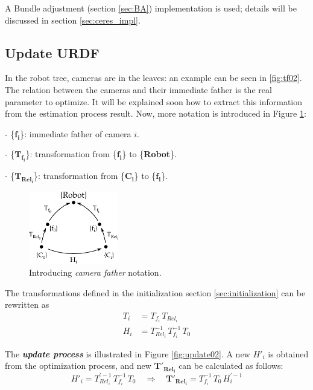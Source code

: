 A Bundle adjustment (section \ref{sec:BA}) implementation is used; details will be discussed in section \ref{sec:ceres_impl}.


\subsection{Update URDF}
\label{sec:update_urdf}

In the robot tree, cameras are in the leaves: an example can be seen in \ref{fig:tf02}. The relation between the cameras and their immediate father is the real parameter to optimize. It will be explained soon how to extract this information from the estimation process result. Now, more notation is introduced in Figure \ref{fig:update01}:
\begin{itemize*}
 \item[-]  \{$\mathbf{f_i}$\}: immediate father of camera $i$.

 \item[-]  \{$\mathbf{T_{f_i}}$\}: transformation from \{$\mathbf{f_i}$\} to \{\textbf{Robot}\}.

 \item[-]  \{$\mathbf{T_{Rel_i}}$\}: transformation from \{$\mathbf{C_i}$\} to \{$\mathbf{f_i}$\}.

\end{itemize*}

\begin{figure}[!htbp]
 \centering
 \includegraphics[width=0.35\textwidth]{images/update01.pdf}
 \caption{Introducing \textit{camera father} notation.}
 \label{fig:update01}
\end{figure}

The transformations defined in the initialization section \ref{sec:initialization} can be rewritten as
\begin{align}
 T_i &= T_{f_i} \, T_{Rel_i} \\
 H_i &= T_{Rel_i}^{-1} \, T_{f_i}^{-1} \, T_0
\end{align}


The \textit{\textbf{update process}} is illustrated in Figure \ref{fig:update02}.
A new $H'_i$ is obtained from the optimization process, and new $\mathbf{T'_{Rel_i}}$ can be calculated as follows:
\begin{equation}
 H'_i = T_{Rel_i}^{' -1} \, T_{f_i}^{-1} \, T_0  \quad \Rightarrow \quad  \mathbf{T'_{Rel_i}} = T_{f_i}^{-1} \, T_0 \, H_{i}^{' -1}
\end{equation}

